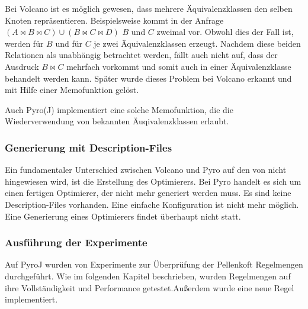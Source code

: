 Bei Volcano ist es möglich gewesen, dass mehrere Äquivalenzklassen den selben Knoten repräsentieren. Beispielsweise kommt in der Anfrage $(A \Join B \Join C) \cup (B \Join C \Join D)$ $B$ und $C$ zweimal vor. Obwohl dies der Fall ist, werden für $B$ und für $C$ je zwei Äquivalenzklassen erzeugt. Nachdem diese beiden Relationen als unabhängig betrachtet werden, fällt auch nicht auf, dass der Ausdruck $B \Join C$ mehrfach vorkommt und somit auch in einer Äquivalenzklasse behandelt werden kann. Später wurde dieses Problem bei Volcano erkannt und mit Hilfe einer Memofunktion gelöst.

Auch Pyro(J) implementiert eine solche Memofunktion, die die Wiederverwendung von bekannten Äuqivalenzklassen erlaubt.


\subsubsection{Generierung mit Description-Files}

Ein fundamentaler Unterschied zwischen Volcano und Pyro auf den von \cite{roy2001multi} nicht hingewiesen wird, ist die Erstellung des Optimierers. Bei Pyro handelt es sich um einen fertigen Optimierer, der nicht mehr generiert werden muss. Es sind keine Description-Files vorhanden. Eine einfache Konfiguration ist nicht mehr möglich. Eine Generierung eines Optimierers findet überhaupt nicht statt.


\subsubsection{Ausführung der Experimente}

Auf PyroJ wurden von \cite{shanbhag2014optimizing} Experimente zur Überprüfung der Pellenkoft Regelmengen durchgeführt. Wie im folgenden Kapitel beschrieben, wurden Regelmengen auf ihre Vollständigkeit und Performance getestet.Außerdem  wurde eine neue Regel implementiert. 

